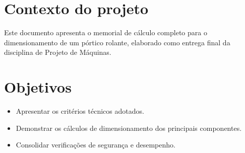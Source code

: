 \section{Contexto do projeto}
Este documento apresenta o memorial de cálculo completo para o dimensionamento de um pórtico rolante, elaborado como entrega final da disciplina de Projeto de Máquinas.

\section{Objetivos}
\begin{itemize}[leftmargin=1.25cm]
  \item Apresentar os critérios técnicos adotados.
  \item Demonstrar os cálculos de dimensionamento dos principais componentes.
  \item Consolidar verificações de segurança e desempenho.
\end{itemize}
